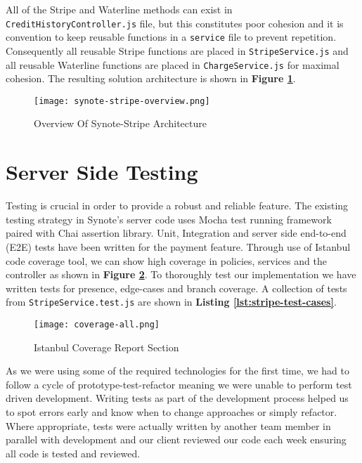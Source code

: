 All of the Stripe and Waterline methods can exist in \texttt{CreditHistoryController.js} file, but this constitutes poor cohesion and it is convention to keep reusable functions in a \texttt{service} file to prevent repetition. Consequently all reusable Stripe functions are placed in \texttt{StripeService.js} and all reusable Waterline functions are placed in \texttt{ChargeService.js} for maximal cohesion. The resulting solution architecture is shown in \textbf{Figure \ref{fig:synote-stripe}}.\\

\begin{figure}[!hbt]
  	\centering
 	\texttt{[image: synote-stripe-overview.png]}
  	\caption{Overview Of Synote-Stripe Architecture}
 	\label{fig:synote-stripe}
\end{figure}

\section{Server Side Testing}
\label{sec:server-side-testing}

Testing is crucial in order to provide a robust and reliable feature. The existing testing strategy in Synote's server code uses Mocha \cite{mocha} test running framework paired with Chai \cite{chai} assertion library. Unit, Integration and server side end-to-end (E2E) tests have been written for the payment feature. Through use of Istanbul \cite{istanbul} code coverage tool, we can show high coverage in policies, services and the controller as shown in \textbf{Figure \ref{fig:coverage}}. To thoroughly test our implementation we have written tests for presence, edge-cases and branch coverage. A collection of tests from \texttt{StripeService.test.js} are shown in \textbf{Listing \ref{lst:stripe-test-cases}}.\\    

\begin{figure}[!hbt]
  	\centering
 	\texttt{[image: coverage-all.png]}
  	\caption{Istanbul Coverage Report Section}
 	\label{fig:coverage}
\end{figure} 

As we were using some of the required technologies for the first time, we had to follow a cycle of prototype-test-refactor meaning we were unable to perform test driven development. Writing tests as part of the development process helped us to spot errors early and know when to change approaches or simply refactor. Where appropriate, tests were actually written by another team member in parallel with development and our client reviewed our code each week ensuring all code is tested and reviewed.\\ 

